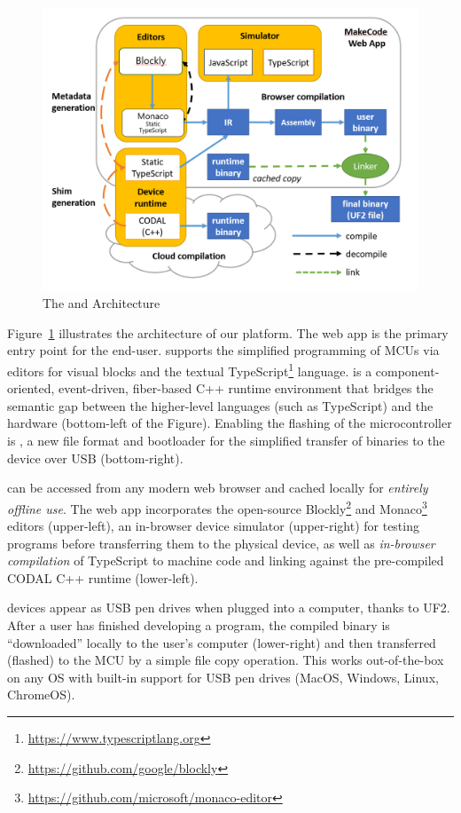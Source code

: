 \begin{figure}[t]
    \includegraphics[width=\columnwidth]{images/arch-diagram.png}
    \setlength{\belowcaptionskip}{-10pt}
    \caption{\label{fig:makecode}The \MC and \CO Architecture}
\end{figure}

Figure~\ref{fig:makecode} illustrates the architecture of our platform.
The \MC web app is the primary entry point for the end-user. \MC supports
the simplified programming of MCUs via editors for visual blocks and the textual TypeScript\footnote{\url{https://www.typescriptlang.org}} language. \CO is a component-oriented, event-driven, fiber-based C++ runtime environment that bridges the semantic gap between the higher-level languages (such
as TypeScript) and the hardware (bottom-left of the Figure).
Enabling the flashing of the microcontroller is \UFN,
a new file format and bootloader for the simplified transfer of binaries to the device over USB (bottom-right).

\MC can be accessed from any modern web browser and cached locally for \emph{entirely offline use}. The \MC web app incorporates the open-source Blockly\footnote{\url{https://github.com/google/blockly}} and Monaco\footnote{\url{https://github.com/microsoft/monaco-editor}} editors (upper-left), an in-browser device simulator (upper-right) for testing programs before transferring them to the physical device, as well as \emph{in-browser compilation} of TypeScript to machine code and linking against the pre-compiled
CODAL C++ runtime (lower-left).

\MC devices appear as USB pen drives when plugged into a computer, thanks to UF2. After a user has finished developing a program, the compiled binary is ``downloaded'' locally to the user's computer (lower-right) and then transferred (flashed) to the MCU by a simple file copy operation. This works out-of-the-box on any OS with built-in support for USB pen drives (MacOS, Windows, Linux, ChromeOS).

